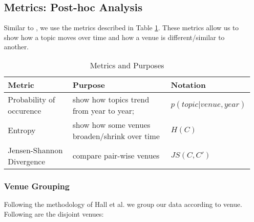 \begin{comment}
\subsubsection{Postrinsic Data}
Upon applying gibbs sampling, we can obtain and/or estimate:
	\begin{itemize}
		\item \textit{topic assignments for each non-stopword of each document};
		\item \textit{topic distribution within each document};
		\item \textit{topic distribution within each venue};
		\item \textit{entropy of each venue for each session of GC \textbf{overall and for each year}}; and
		\item \textit{Jensen Shannon divergence between each pair of venues, described in section \ref{venues} \textbf{for each year}}.
	\end{itemize}
\end{comment}

\subsection{Metrics: Post-hoc Analysis}
Similar to \cite{hall-jurafsky-manning:2008:EMNLP}, we use the metrics described in Table \ref{tab:metric_purposes}. These metrics allow us to show how a topic moves over time and how a venue is different/similar to another.

\begin{table}[center]
	\centering
	\begin{tabular} {| l | l | l |}
		\hline	\textbf{Metric} 		& \textbf{Purpose} & \textbf{Notation} \\ \hline
		\hline	Probability of occurence	& show how topics trend from year to year;	& $p(topic|venue,year)$	\\
		\hline	Entropy				& show how some venues broaden/shrink over time	& $H(C)$ \\
		\hline	Jensen-Shannon Divergence	& compare pair-wise venues	& $JS(C, C')$\\
		\hline
	\end{tabular}
	\caption{Metrics and Purposes}
	\label{tab:metric_purposes}
\end{table}

\subsubsection{Venue Grouping}
\label{venues}
Following the methodology of Hall et al. we group our data according to venue. Following are the disjoint venues:

